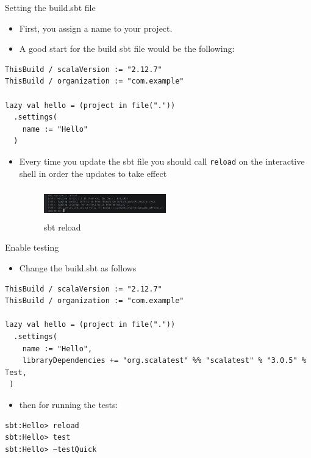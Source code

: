 \documentclass[presentation, aspectratio=169]{beamer}
\begin{document}
\begin{frame}[label={sec:org8529f28},fragile]{Setting the build.sbt file}
 \begin{itemize}
\item First, you assign a name to your project.
\item A good start for the build sbt file would be the following:
\end{itemize}
\tiny
\begin{verbatim}
ThisBuild / scalaVersion := "2.12.7"
ThisBuild / organization := "com.example"

lazy val hello = (project in file("."))
  .settings(
    name := "Hello"
  )
\end{verbatim}
\large
\begin{itemize}
\item Every time you update the sbt file you should call \texttt{reload} on the interactive shell in order
the updates to take effect

\begin{figure}[htbp]
\centering
\includegraphics[width=200px,height=50px]{./img/sbt-reload.png}
\caption{\label{fig:orgd5af0c7}sbt reload}
\end{figure}
\end{itemize}
\end{frame}

\begin{frame}[label={sec:org434be15},fragile]{Enable testing}
 \begin{itemize}
\item Change the build.sbt as follows
\end{itemize}
\tiny
\begin{verbatim}
ThisBuild / scalaVersion := "2.12.7"
ThisBuild / organization := "com.example"

lazy val hello = (project in file("."))
  .settings(
    name := "Hello",
    libraryDependencies += "org.scalatest" %% "scalatest" % "3.0.5" % Test,
 )
\end{verbatim}
\large
\begin{itemize}
\item then for running the tests:
\end{itemize}
\tiny
\begin{verbatim}
sbt:Hello> reload
sbt:Hello> test
sbt:Hello> ~testQuick
\end{verbatim}
\end{frame}
\end{document}
